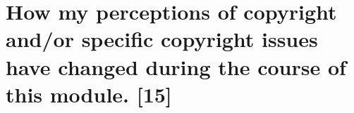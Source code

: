 \documentclass[11pt]{article}
\begin{document}
\section{How my perceptions of copyright and/or specific copyright issues have changed during the course of this module. [15]}
\label{sec:orgfa39968}

\printbibliography
\end{document}
